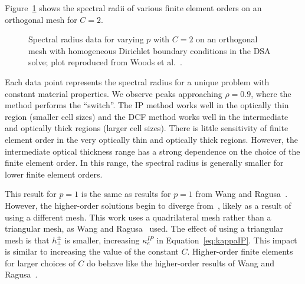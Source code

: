 \documentclass[12pt,letterpaper]{article}
\begin{document}
Figure~\ref{fig:MIPHOC2Ortho} shows the spectral radii of various finite element orders on an orthogonal mesh for $C=2$.
%
\begin{figure}[!hbt]
\centering
{}
\caption{Spectral radius data for varying $p$ with $C=2$ on an orthogonal mesh with homogeneous Dirichlet boundary conditions in the DSA solve; plot reproduced from Woods et al.~\cite{WoodsDSA}.}
\label{fig:MIPHOC2Ortho}
\end{figure}
%
Each data point represents the spectral radius for a unique problem with constant material properties. We observe peaks approaching $\rho = 0.9$, where the method performs the ``switch''. The IP method works well in the optically thin region (smaller cell sizes) and the DCF method works well in the intermediate and optically thick regions (larger cell sizes). There is little sensitivity of finite element order in the very optically thin and optically thick regions. However, the intermediate optical thickness range has a strong dependence on the choice of the finite element order. In this range, the spectral radius is generally smaller for lower finite element orders.

This result for $p=1$ is the same as results for $p=1$ from Wang and Ragusa~\cite{WangRagusaDSA}. However, the higher-order solutions begin to diverge from~\cite{WangRagusaDSA}, likely as a result of using a different mesh. This work uses a quadrilateral mesh rather than a triangular mesh, as Wang and Ragusa~\cite{WangRagusaDSA} used. The effect of using a triangular mesh is that $h_\perp^\pm$ is smaller, increasing $\kappa_e^{IP}$ in Equation~\ref{eq:kappaIP}. This impact is similar to increasing the value of the constant $C$. Higher-order finite elements for larger choices of $C$ do behave like the higher-order results of Wang and Ragusa~\cite{WangRagusaDSA}.
\end{document}
